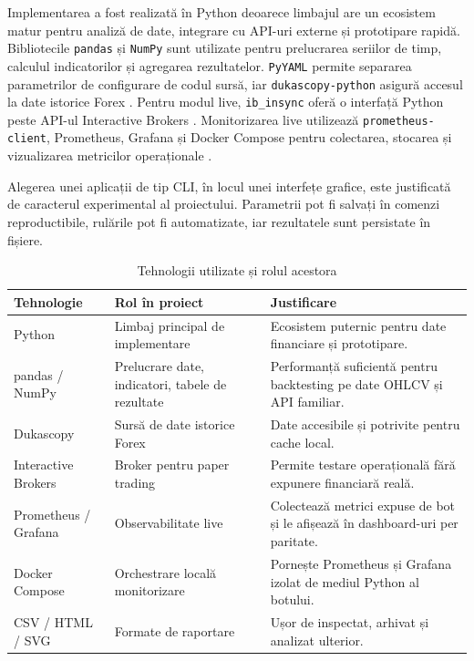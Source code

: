 Implementarea a fost realizată în Python deoarece limbajul are un ecosistem matur pentru analiză de date, integrare cu API-uri externe și prototipare rapidă. Bibliotecile \texttt{pandas} \cite{misc:web:pandas_docs} și \texttt{NumPy} \cite{misc:web:numpy_docs} sunt utilizate pentru prelucrarea seriilor de timp, calculul indicatorilor și agregarea rezultatelor. \texttt{PyYAML} permite separarea parametrilor de configurare de codul sursă, iar \texttt{dukascopy-python} asigură accesul la date istorice Forex \cite{misc:web:dukascopy_python}. Pentru modul live, \texttt{ib\_insync} oferă o interfață Python peste API-ul Interactive Brokers \cite{misc:web:ib_insync,misc:web:ibkr_api}. Monitorizarea live utilizează \texttt{prometheus-client}, Prometheus, Grafana și Docker Compose pentru colectarea, stocarea și vizualizarea metricilor operaționale \cite{misc:web:prometheus_docs,misc:web:grafana_docs,misc:web:docker_compose_docs}.

Alegerea unei aplicații de tip CLI, în locul unei interfețe grafice, este justificată de caracterul experimental al proiectului. Parametrii pot fi salvați în comenzi reproductibile, rulările pot fi automatizate, iar rezultatele sunt persistate în fișiere.

\begin{table}[htbp]
    \centering
    \caption{Tehnologii utilizate și rolul acestora}
    \label{tabel:tehnologii}
    \begin{tabular}{|p{3.5cm}|p{5cm}|p{5.2cm}|}
        \hline
        \textbf{Tehnologie} & \textbf{Rol în proiect} & \textbf{Justificare} \\
        \hline
        Python & Limbaj principal de implementare & Ecosistem puternic pentru date financiare și prototipare. \\
        \hline
        pandas / NumPy & Prelucrare date, indicatori, tabele de rezultate & Performanță suficientă pentru backtesting pe date OHLCV și API familiar. \\
        \hline
        Dukascopy & Sursă de date istorice Forex & Date accesibile și potrivite pentru cache local. \\
        \hline
        Interactive Brokers & Broker pentru paper trading & Permite testare operațională fără expunere financiară reală. \\
        \hline
        Prometheus / Grafana & Observabilitate live & Colectează metrici expuse de bot și le afișează în dashboard-uri per paritate. \\
        \hline
        Docker Compose & Orchestrare locală monitorizare & Pornește Prometheus și Grafana izolat de mediul Python al botului. \\
        \hline
        CSV / HTML / SVG & Formate de raportare & Ușor de inspectat, arhivat și analizat ulterior. \\
        \hline
    \end{tabular}
\end{table}


